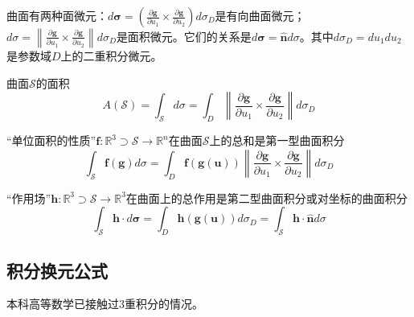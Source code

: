 \documentclass[../main.tex]{subfiles}
\begin{document}
曲面有两种面微元：$d\boldsymbol{\sigma}=\left(\frac{\partial\mathbf{g}}{\partial u_1}\times\frac{\partial\mathbf{g}}{\partial u_2}\right)d\sigma_D$是有向曲面微元；$d\sigma=\left\|\frac{\partial\mathbf{g}}{\partial u_1}\times\frac{\partial\mathbf{g}}{\partial u_2}\right\|d\sigma_D$是面积微元。它们的关系是$d\boldsymbol{\sigma}=\mathbf{\hat{n}}d\sigma$。其中$d\sigma_D=du_1du_2$是参数域$D$上的二重积分微元。

曲面$\mathcal{S}$的面积
\[
    A\left(\mathcal{S}\right)=\int_\mathcal{S}d\sigma=\int_D\left\|\frac{\partial\mathbf{g}}{\partial u_1}\times\frac{\partial\mathbf{g}}{\partial u_2}\right\|d\sigma_D
\]

“单位面积的性质”$\mathbf{f}:\mathbb{R}^3\supset \mathcal{S}\rightarrow\mathbb{R}^n$在曲面$\mathcal{S}$上的总和是第一型曲面积分\cite[p.~165,定理9.4.1]{华工高数2009下}
\[
    \int_\mathcal{S}\mathbf{f}\left(\mathbf{g}\right)d\sigma=\int_D\mathbf{f}\left(\mathbf{g}\left(\mathbf{u}\right)\right)\left\|\frac{\partial\mathbf{g}}{\partial u_1}\times\frac{\partial\mathbf{g}}{\partial u_2}\right\|d\sigma_D
\]

“作用场”$\mathbf{h}:\mathbb{R}^3\supset\mathcal{S}\rightarrow\mathbb{R}^3$在曲面上的总作用是第二型曲面积分或对坐标的曲面积分\cite[\S 9.5]{华工高数2009下}
\[
    \int_\mathcal{S}\mathbf{h}\cdot d\boldsymbol{\sigma}=\int_D\mathbf{h}\left(\mathbf{g}\left(\mathbf{u}\right)\right)d\sigma_D=\int_\mathcal{S}\mathbf{h}\cdot\mathbf{\hat{n}}d\sigma
\]

\subsection{积分换元公式}
本科高等数学已接触过3重积分的情况\cite[\S 8.3“五”]{华工高数2009下}。
\end{document}
